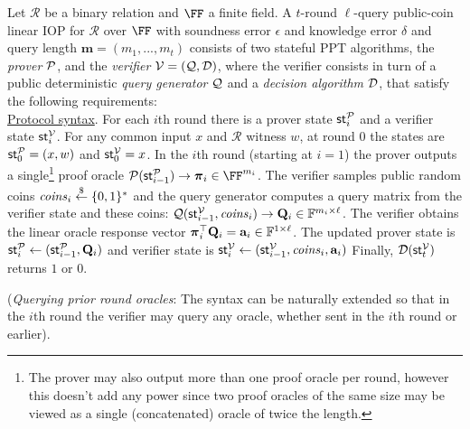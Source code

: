 \begin{definition} 
\label{def:linearIOP}
Let $\mathcal{R}$ be a binary relation and $\FF$ a finite field. A $t$-round $\ell$-query public-coin linear IOP for $\mathcal{R}$ over $\FF$ with soundness error $\epsilon$ and knowledge error $\delta$ and query length $\mathbf{m} = (m_1,...,m_t)$ consists of two stateful PPT algorithms, the \emph{prover} $\mathcal{P}$, and the
\emph{verifier} $\mathcal{V} = (\mathcal{Q}, \mathcal{D})$, where the verifier consists in turn of a public deterministic \emph{query generator} $\mathcal{Q}$ and a
\emph{decision algorithm} $\mathcal{D}$, that satisfy the following requirements:\\
 
\noindent \underline{Protocol syntax}. 
For each $i$th round there is a prover state $\textsf{st}^\mathcal{P}_i$ and a verifier state $\textsf{st}^\mathcal{V}_i$. For any common input $x$ and $\mathcal{R}$ witness $w$, at round 0 the states are $\textsf{st}^\mathcal{P}_0 = (x, w)$ and $\textsf{st}^\mathcal{V}_0 = x$. 
In the $i$th round (starting at $i = 1$) the prover outputs a single\footnote{The prover may also output more than one proof oracle per round, however this doesn't add any power since two proof oracles of the same size may be viewed as a single (concatenated) oracle of twice the length.} proof oracle $\prover(\textsf{st}^\prover_{i-1}) \rightarrow \proofO_i \in \FF^{m_i}$. The verifier samples public random coins $\mathit{coins}_i \overset{\$}{\gets} \{0,1\}^*$ and the query generator computes a query matrix from the verifier state and these coins: $\mathcal{Q}(\textsf{st}^\mathcal{V}_{i-1}, \mathit{coins}_i) \rightarrow \mathbf{Q}_i \in \mathbb{F}^{m_i \times \ell}$. The verifier obtains the linear oracle response vector $\boldsymbol{\pi}_i^\top \mathbf{Q}_i = \mathbf{a}_i \in \mathbb{F}^{1 \times \ell}$. The updated prover state is $\textsf{st}^\mathcal{P}_i \leftarrow (\textsf{st}^\mathcal{P}_{i-1}, \mathbf{Q}_i)$
and verifier state is $\textsf{st}^\mathcal{V}_i \leftarrow (\textsf{st}^\mathcal{V}_{i-1}, \mathit{coins}_i, \mathbf{a}_i)$
Finally, $\mathcal{D}(\textsf{st}^\mathcal{V}_t)$ returns $1$ or $0$. 

(\emph{Querying prior round oracles}: The syntax can be naturally extended so that in the $i$th round the verifier may query any oracle, whether sent in the $i$th round or earlier). \\ 



\end{definition}
